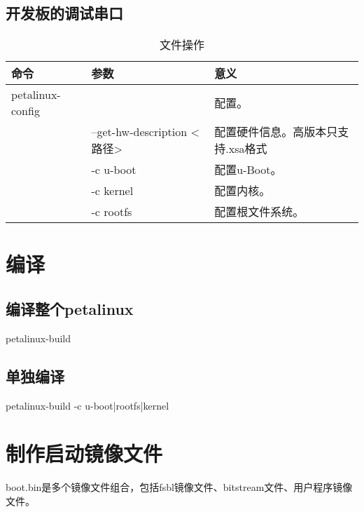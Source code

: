 \documentclass[12pt, a4paper, oneside]{ctexbook}
\newcounter{#2}
\newcounter{#2}[#1]
\numberwithin{#2}{#1}
\begin{document}
            \subsection{开发板的调试串口}
            \begin{table}[!ht]
                \centering
                \caption{文件操作}
                \begin{tabular}{m{}<{\centering}|m{}<{\centering}|m{}<{\raggedright}}
                  \toprule[2pt]
                  {\bf 命令}&{\bf 参数}&{\bf 意义}\\
                  \toprule[1pt]
                  petalinux-config&&配置。\\\midrule
                  &--get-hw-description <路径>&配置硬件信息。高版本只支持.xsa格式\\\midrule
                  &-c u-boot&配置u-Boot。\\\midrule
                  &-c kernel&配置内核。\\\midrule
                  &-c rootfs&配置根文件系统。\\\midrule
                  \bottomrule[2pt]
                \end{tabular}
              \end{table}
              \section{编译}
              \subsection{编译整个petalinux}
              petalinux-build
              \subsection{单独编译}
              petalinux-build -c u-boot|rootfs|kernel
              \section{制作启动镜像文件}
              boot.bin是多个镜像文件组合，包括fsbl镜像文件、bitstream文件、用户程序镜像文件。
\end{document}
